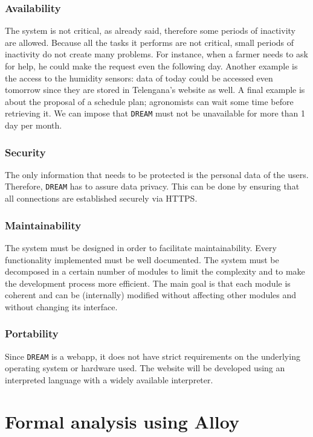 \documentclass{article}
\begin{document}
\subsubsection{Availability}
The system is not critical, as already said, therefore some periods of inactivity are allowed. Because all the tasks it performs are not critical, small periods of inactivity do not create many problems. For instance, when a farmer needs to ask for help, he could make the request even the following day. Another example is the access to the humidity sensors: data of today could be accessed even tomorrow since they are stored in Telengana’s website as well. A final example is about the proposal of a schedule plan; agronomists can wait some time before retrieving it. 
We can impose that \verb|DREAM| must not be unavailable for more than 1 day per month.
\subsubsection{Security}
The only information that needs to be protected is the personal data of the users. Therefore, \verb|DREAM| has to assure data privacy. This can be done by ensuring that all connections are established securely via HTTPS.
\subsubsection{Maintainability}
The system must be designed in order to facilitate maintainability. Every functionality implemented must be well documented. The system must be decomposed in a certain number of modules to limit the complexity and to make the development process more efficient. The main goal is that each module is coherent and can be (internally) modified without affecting other modules and without changing its interface.
\subsubsection{Portability}
Since \verb|DREAM| is a webapp, it does not have strict requirements on the underlying operating system or hardware used. The website will be developed using an interpreted language with a widely available interpreter.

\section{Formal analysis using Alloy}
\end{document}
